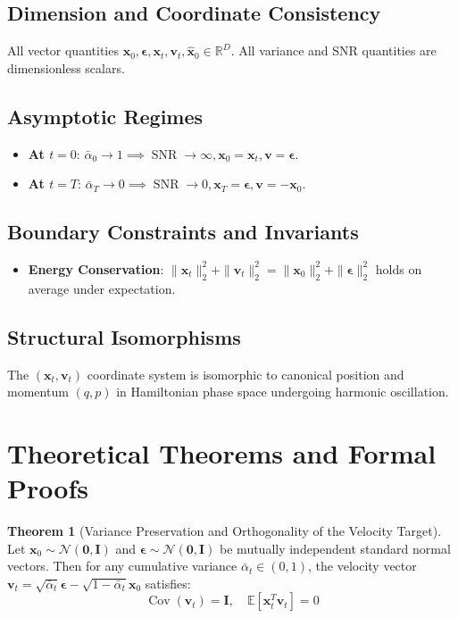 \documentclass[11pt,a4paper]{article}
\theoremstyle{definition}
\newtheorem{theorem}{\textbf{Theorem}}[section]
\begin{document}
\subsection{Dimension and Coordinate Consistency}
All vector quantities $\mathbf{x}_0, \boldsymbol{\epsilon}, \mathbf{x}_t, \mathbf{v}_t, \hat{\mathbf{x}}_0 \in \mathbb{R}^D$. All variance and SNR quantities are dimensionless scalars.

\subsection{Asymptotic Regimes}
\begin{itemize}
    \item \textbf{At $t = 0$}: $\bar{\alpha}_0 \to 1 \implies \operatorname{SNR} \to \infty, \mathbf{x}_0 = \mathbf{x}_t, \mathbf{v} = \boldsymbol{\epsilon}$.
    \item \textbf{At $t = T$}: $\bar{\alpha}_T \to 0 \implies \operatorname{SNR} \to 0, \mathbf{x}_T = \boldsymbol{\epsilon}, \mathbf{v} = -\mathbf{x}_0$.
\end{itemize}

\subsection{Boundary Constraints and Invariants}
\begin{itemize}
    \item \textbf{Energy Conservation}: $\|\mathbf{x}_t\|_2^2 + \|\mathbf{v}_t\|_2^2 = \|\mathbf{x}_0\|_2^2 + \|\boldsymbol{\epsilon}\|_2^2$ holds on average under expectation.
\end{itemize}

\subsection{Structural Isomorphisms}
The $(\mathbf{x}_t, \mathbf{v}_t)$ coordinate system is isomorphic to canonical position and momentum $(q, p)$ in Hamiltonian phase space undergoing harmonic oscillation.

\section{Theoretical Theorems and Formal Proofs}

\begin{theorem}[Variance Preservation and Orthogonality of the Velocity Target]
Let $\mathbf{x}_0 \sim \mathcal{N}(\mathbf{0}, \mathbf{I})$ and $\boldsymbol{\epsilon} \sim \mathcal{N}(\mathbf{0}, \mathbf{I})$ be mutually independent standard normal vectors. Then for any cumulative variance $\bar{\alpha}_t \in (0, 1)$, the velocity vector $\mathbf{v}_t = \sqrt{\bar{\alpha}_t}\boldsymbol{\epsilon} - \sqrt{1 - \bar{\alpha}_t}\mathbf{x}_0$ satisfies:
{\boldmath
\begin{equation}
\operatorname{Cov}(\mathbf{v}_t) = \mathbf{I}, \quad \mathbb{E}\left[ \mathbf{x}_t^T \mathbf{v}_t \right] = 0
\end{equation}
}
\end{theorem}
\end{document}
